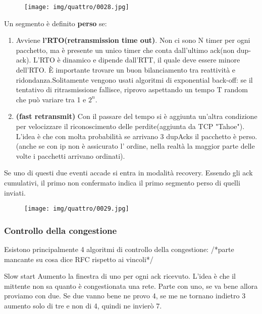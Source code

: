 \documentclass{article}
\begin{document}
 \begin{figure}[!ht]
    \begin{center}
        \texttt{[image: img/quattro/0028.jpg]}         
    \end{center}
\end{figure}
\noindent Un segmento è definito \textbf{perso} se:
\begin{enumerate}
    \item Avviene \textbf{l'RTO(retransmission time out)}. Non ci sono  N timer per ogni pacchetto, ma è presente un unico timer
    che conta dall'ultimo ack(non dup-ack). L'RTO è dinamico e dipende dall'RTT, il quale deve essere minore dell'RTO. È importante 
    trovare un buon bilanciamento tra reattività e ridondanza.Solitamente vengono usati algoritmi di exponential back-off: 
    se il tentativo di ritrasmissione fallisce, riprovo aspettando un tempo  T random che può variare tra 1 e $2^n$. 
    \item \textbf{(fast retransmit)} Con il passare del tempo si è aggiunta un'altra condizione per velocizzare il riconoscimento delle 
    perdite(aggiunta da TCP "Tahoe"). L'idea è che con molta probabilità se arrivano 3 dupAcks il pacchetto è perso.
    (anche se con ip non è assicurato l' ordine, nella realtà la maggior parte delle volte i pacchetti arrivano ordinati).
\end{enumerate}
\noindent Se uno di questi due eventi accade si entra in modalità recovery. Essendo gli ack cumulativi, il primo non confermato indica
 il primo segmento perso di quelli inviati.

 \begin{figure}[!ht]
    \begin{center}
        \texttt{[image: img/quattro/0029.jpg]}         
    \end{center}
\end{figure}

\subsubsection{Controllo della congestione}
\noindent Esistono principalmente 4 algoritmi di controllo della congestione:
/*parte mancante su cosa dice RFC rispetto ai vincoli*/
\medskip

Slow start
Aumento la finestra di uno per ogni ack ricevuto.
L'idea è che il mittente non sa quanto è congestionata una rete. Parte con uno, se va bene allora proviamo con due. Se due vanno bene ne provo 
4, se me ne tornano indietro 3 aumento solo di tre e non di 4, quindi ne invierò 7. 
\end{document}
